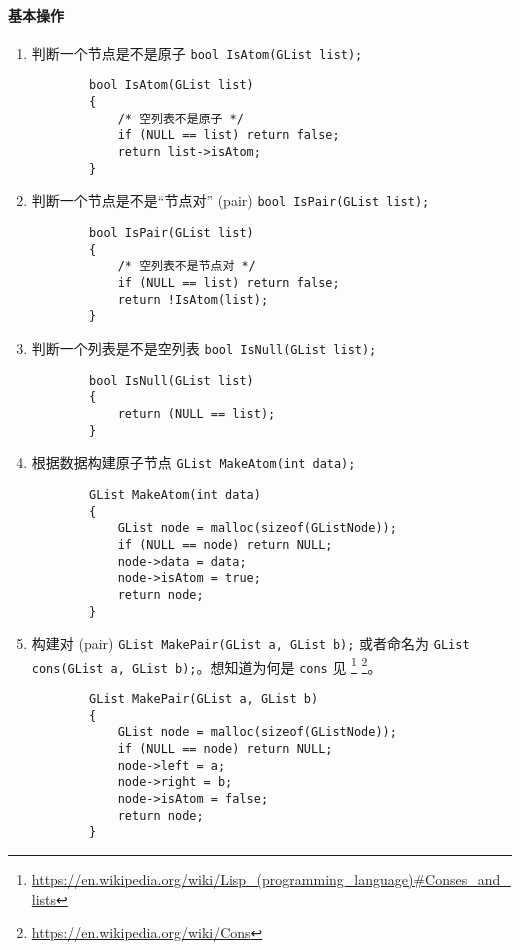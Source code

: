 \documentclass{ctexart}
\begin{document}
\paragraph{基本操作}
\begin{enumerate}
    \item 判断一个节点是不是原子 \texttt{bool IsAtom(GList list);}
        \begin{verbatim}
        bool IsAtom(GList list)
        {
            /* 空列表不是原子 */
            if (NULL == list) return false;
            return list->isAtom;
        }
        \end{verbatim}

    \item 判断一个节点是不是“节点对” (pair) \texttt{bool IsPair(GList list);}
        \begin{verbatim}
        bool IsPair(GList list)
        {
            /* 空列表不是节点对 */
            if (NULL == list) return false;
            return !IsAtom(list);
        }
        \end{verbatim}

    \item 判断一个列表是不是空列表 \texttt{bool IsNull(GList list);}
        \begin{verbatim}
        bool IsNull(GList list)
        {
            return (NULL == list);
        }
        \end{verbatim}

    \item 根据数据构建原子节点 \texttt{GList MakeAtom(int data);}
        \begin{verbatim}
        GList MakeAtom(int data)
        {
            GList node = malloc(sizeof(GListNode));
            if (NULL == node) return NULL;
            node->data = data;
            node->isAtom = true;
            return node;
        }
        \end{verbatim}

    \item 构建对 (pair) \texttt{GList MakePair(GList a, GList b);} 或者命名为 \texttt{GList cons(GList a, GList b);}。想知道为何是 \texttt{cons} 见 \footnote{\url{https://en.wikipedia.org/wiki/Lisp_(programming_language)\#Conses_and_lists}} \footnote{\url{https://en.wikipedia.org/wiki/Cons}}。
        \begin{verbatim}
        GList MakePair(GList a, GList b)
        {
            GList node = malloc(sizeof(GListNode));
            if (NULL == node) return NULL;
            node->left = a;
            node->right = b;
            node->isAtom = false;
            return node;
        }
        \end{verbatim}


\end{enumerate}
\end{document}
